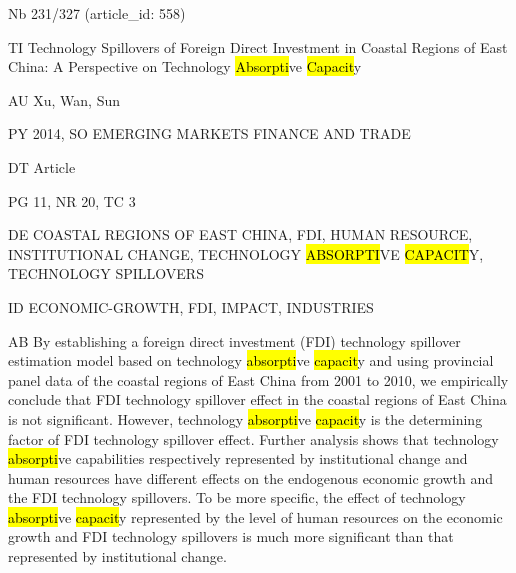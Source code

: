 \documentclass[a4paper]{article}
\begin{document}
\vspace*{-2cm}
Nb \tabto{0cm}231/327 (article\_id: 558)\par
TI \tabto{0cm}Technology Spillovers of Foreign Direct Investment in Coastal Regions of East China: A Perspective on Technology \hl{Absorpti}ve \hl{Capacit}y\par
AU \tabto{0cm}Xu, Wan, Sun\par
PY \tabto{0cm}2014, SO EMERGING MARKETS FINANCE AND TRADE\par
DT \tabto{0cm}Article\par
PG \tabto{0cm}11, NR 20, TC 3\par
DE \tabto{0cm}COASTAL REGIONS OF EAST CHINA, FDI, HUMAN RESOURCE, INSTITUTIONAL CHANGE, TECHNOLOGY \hl{ABSORPTI}VE \hl{CAPACIT}Y, TECHNOLOGY SPILLOVERS\par
ID \tabto{0cm}ECONOMIC-GROWTH, FDI, IMPACT, INDUSTRIES\par
AB \tabto{0cm}By establishing a foreign direct investment (FDI) technology spillover estimation model based on technology \hl{absorpti}ve \hl{capacit}y and using provincial panel data of the coastal regions of East China from 2001 to 2010, we empirically conclude that FDI technology spillover effect in the coastal regions of East China is not significant. However, technology \hl{absorpti}ve \hl{capacit}y is the determining factor of FDI technology spillover effect. Further analysis shows that technology \hl{absorpti}ve capabilities respectively represented by institutional change and human resources have different effects on the endogenous economic growth and the FDI technology spillovers. To be more specific, the effect of technology \hl{absorpti}ve \hl{capacit}y represented by the level of human resources on the economic growth and FDI technology spillovers is much more significant than that represented by institutional change.\par
\clearpage
\end{document}
